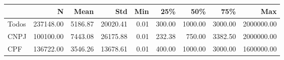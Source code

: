 \begin{tabular}{lrrrrrrrr}
\toprule
{} &         N &    Mean &      Std &  Min &    25\% &     50\% &     75\% &        Max \\
\midrule
Todos & 237148.00 & 5186.87 & 20020.41 & 0.01 & 300.00 & 1000.00 & 3000.00 & 2000000.00 \\
CNPJ  & 100100.00 & 7443.08 & 26175.88 & 0.01 & 232.38 &  750.00 & 3382.50 & 2000000.00 \\
CPF   & 136722.00 & 3546.26 & 13678.61 & 0.01 & 400.00 & 1000.00 & 3000.00 & 1600000.00 \\
\bottomrule
\end{tabular}
